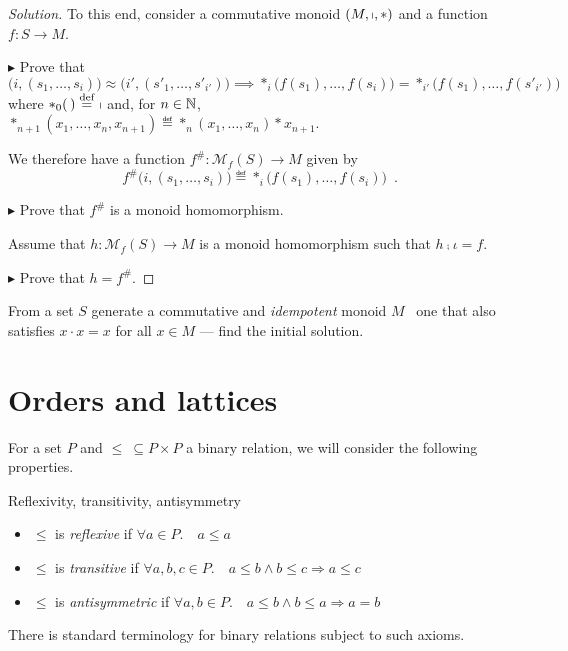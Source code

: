 \begin{proof}[Solution]
To this end, consider a commutative monoid $(M,\shortmid,\ast)$ and a function
$f:S\to M$.

$\blacktriangleright$ Prove that
\[
  \big(i,(s_1,\ldots,s_i)\big)
  \approx
  \big(i',(s'_1,\ldots,s'_{i'})\big)
  \implies
  \ast_i\big(f(s_1),\ldots,f(s_i)\big)
  =
  \ast_{i'}\big(f(s_1),\ldots,f(s'_{i'})\big)
\]
where $\ast_0(\,) \stackrel{\text{def}}{=}\ \shortmid$ and, for $n\in\mathbb{N}$,
$\ast_{n+1}(x_1,\ldots,x_n,x_{n+1})\eqdef \ast_n(x_1,\ldots,x_n)\ast x_{n+1}$.

We therefore have a function $f^\#: \mathcal M_f(S)\to M$ given by
\[
  f^\#\big(i,(s_1,\ldots,s_i)\big)
  \eqdef
  \ast_i\big( f(s_1),\ldots,f(s_i)\big)
  \enspace.
\]

$\blacktriangleright$ Prove that $f^\#$ is a monoid homomorphism.

Assume that $h:\mathcal M_f(S)\to M$ is a monoid homomorphism such that
$h\comp\iota=f$.

$\blacktriangleright$ Prove that $h=f^\#$.
\end{proof}

\begin{exercise}
From a set $S$ generate a commutative and \textit{idempotent} monoid $M$ \ie~one
that also satisfies $x \cdot x = x$ for all $x \in M$ --- find the initial
solution.
\end{exercise}

\section{Orders and lattices}

For a set $P$ and $\leq\ \subseteq P \times P$ a binary relation, we will
consider the following properties.

\begin{definition}
Reflexivity, transitivity, antisymmetry
\begin{itemize}[noitemsep,topsep=0pt]
    \item $\leq$ is \textit{reflexive} if $\forall a \in P.\quad a \leq a$
    \item $\leq$ is \textit{transitive} if
      $\forall a,b,c \in P. \quad a \leq b \wedge b \leq c \Rightarrow a \leq c$
    \item $\leq$ is \textit{antisymmetric} if $\forall a,b \in P. \quad
      a \leq b \wedge b \leq a \Rightarrow a = b$
\end{itemize}
\end{definition}

There is standard terminology for binary relations subject to such axioms.

